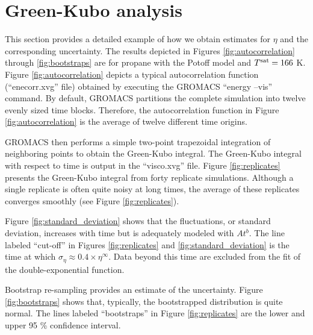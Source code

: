 \documentclass[preprint,review,11pt]{elsarticle}
\begin{document}

    \clearpage
	\newpage
	
	\section{Green-Kubo analysis} \label{SI:GK_analysis}
	
	This section provides a detailed example of how we obtain estimates for $\eta$ and the corresponding uncertainty. The results depicted in Figures \ref{fig:autocorrelation} through \ref{fig:bootstraps} are for propane with the Potoff model and $T^{\rm sat} = 166$ K. Figure \ref{fig:autocorrelation} depicts a typical autocorrelation function (``enecorr.xvg'' file) obtained by executing the GROMACS ``energy --vis'' command. By default, GROMACS partitions the complete simulation into twelve evenly sized time blocks. Therefore, the autocorrelation function in Figure \ref{fig:autocorrelation} is the average of twelve different time origins. 
	
	GROMACS then performs a simple two-point trapezoidal integration of neighboring points to obtain the Green-Kubo integral. The Green-Kubo integral with respect to time is output in the ``visco.xvg'' file. Figure \ref{fig:replicates} presents the Green-Kubo integral from forty replicate simulations. Although a single replicate is often quite noisy at long times, the average of these replicates converges smoothly (see Figure \ref{fig:replicates}). 
	
	Figure \ref{fig:standard_deviation} shows that the fluctuations, or standard deviation, increases with time but is adequately modeled with $A t^{b}$. The line labeled ``cut-off'' in Figures \ref{fig:replicates} and \ref{fig:standard_deviation} is the time at which $\sigma_{\eta} \approx 0.4 \times \eta^\infty$. Data beyond this time are excluded from the fit of the double-exponential function. 
	
	Bootstrap re-sampling provides an estimate of the uncertainty. Figure \ref{fig:bootstraps} shows that, typically, the bootstrapped distribution is quite normal. The lines labeled ``bootstraps'' in Figure \ref{fig:replicates} are the lower and upper 95 \% confidence interval.
	
\end{document}
